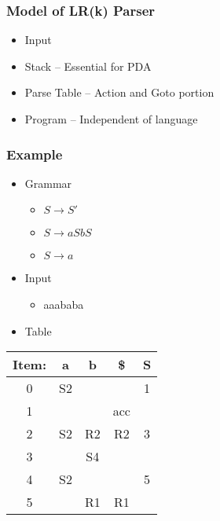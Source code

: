\documentclass[usepdftitle=false,professionalfonts,compress ]{beamer}
\begin{document}
{
\begin{frame}\frametitle{Model of LR(k) Parser}

	\begin{itemize}
	\item Input
			\item Stack -- Essential for PDA
			\item Parse Table -- Action and Goto portion
			\item Program -- Independent of language
				\end{itemize}

\end{frame}}






{
\begin{frame}\frametitle{Example}

	\begin{itemize}
	\item Grammar

	\begin{itemize}
	\item $S \rightarrow S'$
			\item $S \rightarrow aSbS$
			\item $S \rightarrow a$
				\end{itemize}

			\item Input

	\begin{itemize}
	\item aaababa
				\end{itemize}

			\item Table
			\end{itemize}
\begin{tabular}{|c|c|c|c|c|}
\hline
Item:& a  & b & \$ & S \\
\hline
0    & S2 &   &    & 1 \\
1    &    &   & acc&  \\
2    & S2 & R2& R2 & 3 \\
3    &    & S4  &    &  \\
4    & S2   &   &    & 5 \\
5    &    & R1  & R1   &  \\
\hline
\end{tabular}
				
\end{frame}}
\end{document}
